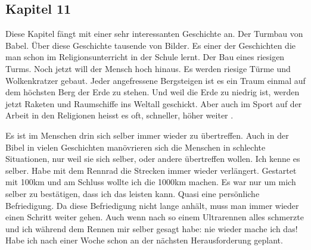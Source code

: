 \subsection{Kapitel 11}
Diese Kapitel fängt mit einer sehr interessanten Geschichte an. Der Turmbau von Babel. Über diese Geschichte tausende von Bilder. Es einer der Geschichten die man schon im Religionsunterricht in der Schule lernt. Der Bau eines riesigen Turms. Noch jetzt will der Mensch hoch hinaus. Es werden riesige Türme und Wolkenkratzer gebaut. Jeder angefressene Bergsteigen ist es ein Traum einmal auf dem höchsten Berg der Erde zu stehen. Und weil die Erde zu niedrig ist, werden jetzt Raketen und Raumschiffe ins Weltall geschickt. Aber auch im Sport auf der Arbeit in den Religionen heisst es oft, \frqq schneller, höher weiter \flqq{}.

Es ist im Menschen drin sich selber immer wieder zu übertreffen. Auch in der Bibel in vielen Geschichten manövrieren sich die Menschen in schlechte Situationen, nur weil sie sich selber, oder andere übertreffen wollen. Ich kenne es selber. Habe mit dem Rennrad die Strecken immer wieder verlängert. Gestartet mit 100km und am Schluss wollte ich die 1000km machen. Es war nur um mich selber zu bestätigen, dass ich das leisten kann. Quasi eine persönliche Befriedigung. Da diese Befriedigung nicht lange anhält, muss man immer wieder einen Schritt weiter gehen. Auch wenn nach so einem Ultrarennen alles schmerzte und ich während dem Rennen mir selber gesagt habe: \frqq nie wieder mache ich das!\flqq{} Habe ich nach einer Woche schon an der nächsten Herausforderung geplant.

